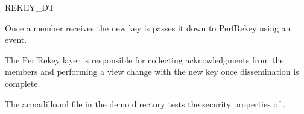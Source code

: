 \begin{Layer}{REKEY\_DT}
\begin{Protocol}
Once a member receives the new key is passes it down to PerfRekey
using an  event.

The PerfRekey layer is responsible for collecting acknowledgments from the
members and performing a view change with the new key once
dissemination is complete. 
\end{Protocol}

\begin{Sources}
\end{Sources}

\begin{GenEvent}
\end{GenEvent}

\begin{Testing}
\item 
The armadillo.ml file in the demo directory tests the security properties
of \ensemble.
\end{Testing}

\end{Layer}


